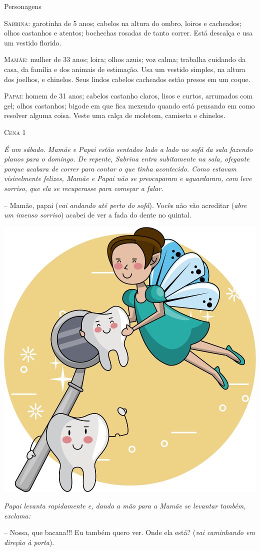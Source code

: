 \begin{myquote}
Personagens

\textsc{Sabrina}: garotinha de 5 anos; cabelos na altura do ombro, loiros
e cacheados; olhos castanhos e atentos; bochechas rosadas de tanto
correr. Está descalça e usa um vestido florido.

\textsc{Mamãe}: mulher de 33 anos; loira; olhos azuis; voz calma; trabalha
cuidando da casa, da família e dos animais de estimação. Usa um vestido
simples, na altura dos joelhos, e chinelos. Seus lindos cabelos
cacheados estão presos em um coque.

\textsc{Papai}: homem de 31 anos; cabelos castanho claros, lisos e curtos,
arrumados com gel; olhos castanhos; bigode em que fica mexendo quando
está pensando em como resolver alguma coisa. Veste uma calça de moletom,
camiseta e chinelos.

\textsc{Cena 1}

\textit{É um sábado. Mamãe e Papai estão sentados lado a lado no sofá da sala
fazendo planos para o domingo. De repente, Sabrina entra subitamente na
sala, ofegante porque acabara de correr para contar o que tinha
acontecido. Como estavam visivelmente felizes, Mamãe e Papai não se
preocuparam e aguardaram, com leve sorriso, que ela se recuperasse para
começar a falar.}

-- Mamãe, papai (\textit{vai andando até perto do sofá}). Vocês não vão acreditar
(\textit{abre um imenso sorriso}) acabei de ver a fada do dente no quintal.

\begin{center}
\includegraphics[width=.5\textwidth]{./media/image23u.png}
\end{center}

\textit{Papai levanta rapidamente e, dando a mão para a Mamãe se levantar
também, exclama:} 

-- Nossa, que bacana!!! Eu também quero ver. Onde ela
está? (\textit{vai caminhando em direção à porta}).

\end{myquote}

